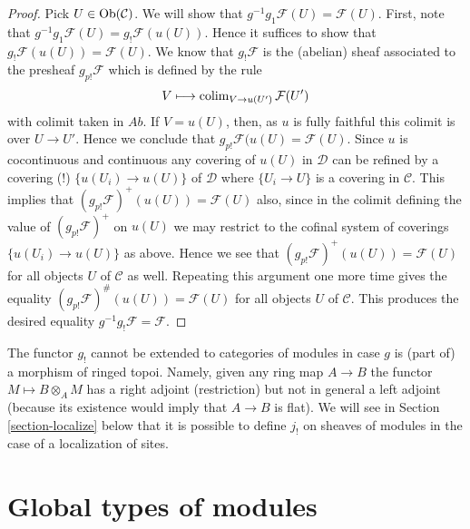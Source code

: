 \begin{proof}
Pick $U \in \mathop{\rm Ob}\nolimits(\mathcal{C})$. We will show that
$g^{-1}g_1\mathcal{F}(U) = \mathcal{F}(U)$. First, note that
$g^{-1}g_1\mathcal{F}(U) = g_!\mathcal{F}(u(U))$. Hence it suffices
to show that $g_!\mathcal{F}(u(U)) = \mathcal{F}(U)$.
We know that $g_{!}\mathcal{F}$ is the (abelian) sheaf associated
to the presheaf $g_{p!}\mathcal{F}$ which is defined by the rule
$$
V \longmapsto \mathop{\rm colim}\nolimits_{V \to u(U')} \mathcal{F}(U')
$$
with colimit taken in $\textit{Ab}$. If $V = u(U)$, then, as $u$ is
fully faithful this colimit is over $U \to U'$. Hence we conclude
that $g_{p!}\mathcal{F}(u(U) = \mathcal{F}(U)$.
Since $u$ is cocontinuous and continuous any covering of $u(U)$ in
$\mathcal{D}$ can be refined by a covering (!) $\{u(U_i) \to u(U)\}$
of $\mathcal{D}$ where $\{U_i \to U\}$ is a covering in $\mathcal{C}$.
This implies that $(g_{p!}\mathcal{F})^+(u(U)) = \mathcal{F}(U)$ also,
since in the colimit defining the value of $(g_{p!}\mathcal{F})^+$
on $u(U)$ we may restrict to the cofinal system of coverings
$\{u(U_i) \to u(U)\}$ as above. Hence we see that
$(g_{p!}\mathcal{F})^+(u(U)) = \mathcal{F}(U)$ for all objects $U$
of $\mathcal{C}$ as well. Repeating this argument one more time
gives the equality $(g_{p!}\mathcal{F})^\#(u(U)) = \mathcal{F}(U)$
for all objects $U$ of $\mathcal{C}$. This produces the desired
equality $g^{-1}g_!\mathcal{F} = \mathcal{F}$.
\end{proof}

\begin{remark}
\label{remark-no-extension}
The functor $g_!$ cannot be extended to categories of modules in case
$g$ is (part of) a morphism of ringed topoi. Namely, given any ring map
$A \to B$ the functor $M \mapsto B \otimes_A M$ has a right adjoint
(restriction) but not in general a left adjoint (because its existence
would imply that $A \to B$ is flat). We will see in
Section \ref{section-localize}
below that it is possible to define $j_!$ on sheaves of modules
in the case of a localization of sites.
\end{remark}






\section{Global types of modules}
\label{section-global}

